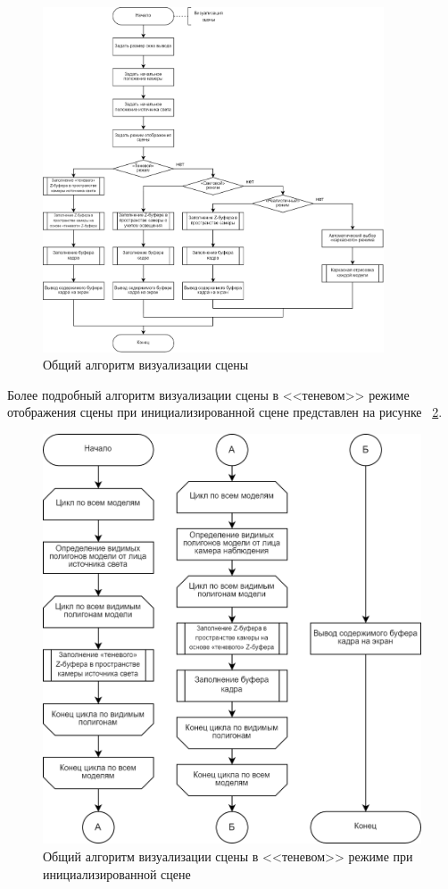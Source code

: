 \begin{figure}[h] 
	\centering
	\includegraphics[width=0.9\textwidth]{images/scene-visualization.png}
	\caption{Общий алгоритм визуализации сцены} 
	\label{fig:scene-visualization} 
\end{figure}

Более подробный алгоритм визуализации сцены в <<теневом>> режиме отображения сцены при инициализированной сцене представлен на рисунке~
\ref{fig:shadow-mod}.
\begin{figure}[h] 
	\centering
	\includegraphics[width=1\textwidth]{images/shadow-mod.png}
	\caption{Общий алгоритм визуализации сцены в <<теневом>> режиме при инициализированной сцене} 
	\label{fig:shadow-mod} 
\end{figure}


